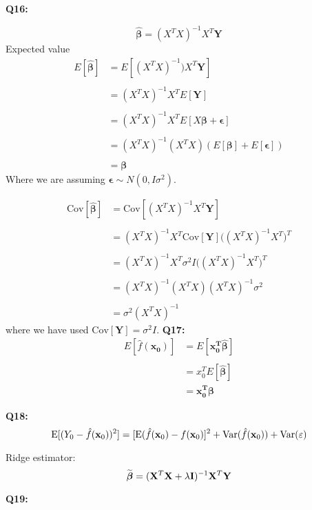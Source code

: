 \documentclass[]{article}
\begin{document}
\textbf{Q16:}

\[
\hat{\boldsymbol{\beta}} = (X^TX)^{-1}X^T\mathbf{Y}
\] Expected value \[
  \begin{split}
    E[\boldsymbol{\hat{\beta}}] &= E[(X^TX)^{-1})X^T\mathbf{Y}]\\
    &\\
    &= (X^TX)^{-1}X^TE[\mathbf{Y}]\\
    &\\
    &= (X^TX)^{-1}X^TE[X\boldsymbol{\beta} + \boldsymbol{\epsilon}]\\
    &\\
    &= (X^TX)^{-1}(X^TX)(E[\boldsymbol{\beta}] + E[\boldsymbol{\epsilon}])\\
    &\\
    &= \boldsymbol{\beta}
  \end{split}
\] Where we are assuming \(\boldsymbol{\epsilon} \sim N(0,I\sigma^2)\).

\[
\begin{split}
\text{Cov}[\boldsymbol{\hat{\beta}}] &= \text{Cov}[(X^TX)^{-1}X^T\mathbf{Y}]\\
&\\
&= (X^TX)^{-1}X^T\text{Cov}[\mathbf{Y}]\bigg((X^TX)^{-1}X^T\bigg)^T\\
&\\
&= (X^TX)^{-1}X^T\sigma^2I\bigg((X^TX)^{-1}X^T\bigg)^T\\
&\\
&= (X^TX)^{-1}(X^TX)(X^TX)^{-1}\sigma^2\\
&\\
&= \sigma^2(X^TX)^{-1}
\end{split}
\] where we have used \(\text{Cov}[\mathbf{Y}] = \sigma^2I\).
\textbf{Q17:} \[
  \begin{split}
    E[\hat{f}(\boldsymbol{x_0})] &= E[\boldsymbol{x_0^T \boldsymbol{\hat{\beta}}}]\\
    &\\
    &= x_0^T E[\boldsymbol{\boldsymbol{\hat{\beta}}}] \\
    &= \boldsymbol{x_0^T}  \boldsymbol{\beta}
  \end{split}
\]

\textbf{Q18:} \[
\text{E}[(Y_0-\hat{f}({\bf x}_0))^2]=[\text{E}(\hat{f}({\bf x}_0)-f({\bf x}_0)]^2+\text{Var}(\hat{f}({\bf x}_0) ) + \text{Var}(\varepsilon)
\]

Ridge estimator: \[
\widetilde{\boldsymbol \beta}=({\bf X}^T{\bf X}+\lambda {\bf I})^{-1}{\bf X}^T{\bf Y}
\]

\textbf{Q19:}
\end{document}

